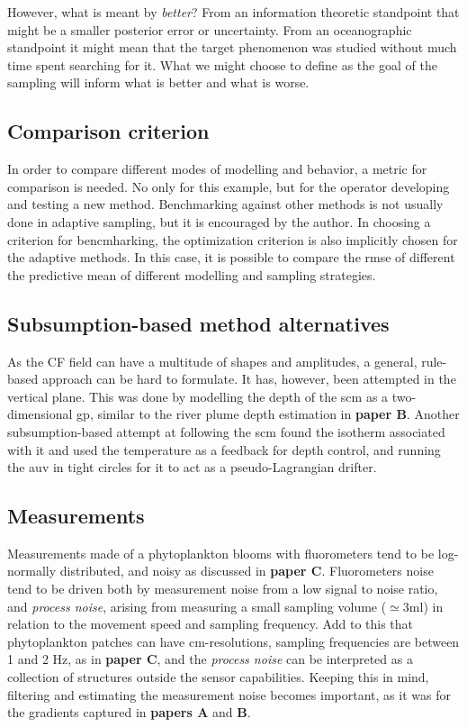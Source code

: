 However, what is meant by \textit{better}? From an information theoretic standpoint that might be a smaller posterior error or uncertainty. From an oceanographic standpoint it might mean that the target phenomenon was studied without much time spent searching for it. What we might choose to define as the goal of the sampling will inform what is better and what is worse. 

\subsection{Comparison criterion}
In order to compare different modes of modelling and behavior, a metric for comparison is needed. No only for this example, but for the operator developing and testing a new method. Benchmarking against other methods is not usually done in adaptive sampling, but it is encouraged by the author. In choosing a criterion for bencmharking, the optimization criterion is also implicitly chosen for the adaptive methods. In this case, it is possible to compare the \acrshort{rmse} of different the predictive mean of different modelling and sampling strategies. 

\subsection{Subsumption-based method alternatives}
As the CF field can have a multitude of shapes and amplitudes, a general, rule-based approach can be hard to formulate. It has, however, been attempted\cite{fossum2019toward} in the vertical plane. This was done by modelling the depth of the \acrfull{scm} as a two-dimensional \acrshort{gp}, similar to the river plume depth estimation in \textbf{paper B}. Another subsumption-based attempt at following the \acrshort{scm} \cite{zhang2019autonomous} found the isotherm associated with it and used the temperature as a feedback for depth control, and running the \acrshort{auv} in tight circles for it to act as a pseudo-Lagrangian drifter. 

\subsection{Measurements}
Measurements made of a phytoplankton blooms with fluorometers tend to be log-normally distributed\cite{low2009multi,kemna2016adaptive}, and noisy as discussed in \textbf{paper C}. Fluorometers noise tend to be driven both by measurement noise from a low signal to noise ratio, and \textit{process noise}, arising from measuring a small sampling volume ($\simeq 3$ml\cite{boss2016primer}) in relation to the movement speed and sampling frequency. Add to this that phytoplankton patches can have cm-resolutions\cite{mitchell2008phytoplankton,durham2012thin}, sampling frequencies are between 1 and 2 Hz, as in \textbf{paper C}, and the \textit{process noise} can be interpreted as a collection of structures outside the sensor capabilities. Keeping this in mind, filtering and estimating the measurement noise becomes important, as it was for the gradients captured in \textbf{papers A} and \textbf{B}. 


